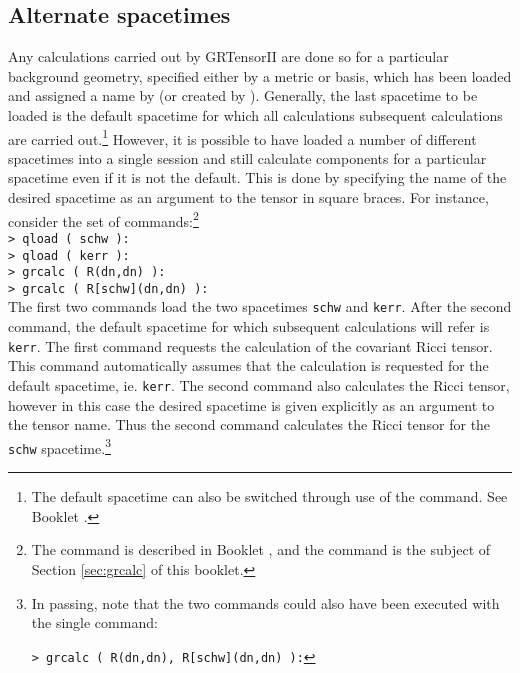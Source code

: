 \documentclass{article}
\begin{document}
\subsection{Alternate spacetimes} \label{sec:altg}
%
Any calculations carried out by GRTensorII are done so for a particular
background geometry, specified either by a metric or basis, which has
been loaded and assigned a name by  (or created by
). Generally, the last spacetime to be loaded is the
default spacetime for which all calculations subsequent calculations are
carried out.\footnote{The default spacetime can also be switched through
use of the  command. See Booklet \grMakegRef.}
However, it is possible to have
loaded a number of different spacetimes into a single session and still
calculate components for a particular spacetime even if it is not the
default. This is done by specifying the name of the desired spacetime
as an argument to the tensor in square braces. For instance, consider
the set of commands:\footnote{The  command is described in
Booklet \grMakegRef, and the  command is the subject of
Section \ref{sec:grcalc} of this booklet.}\\

\noindent\texttt{> qload ( schw ):} \\
\texttt{> qload ( kerr ):} \\
\texttt{> grcalc ( R(dn,dn) ):} \\
\texttt{> grcalc ( R[schw](dn,dn) ):} \\

\noindent The first two commands load the two spacetimes \texttt{schw}
and \texttt{kerr}. After the second command, the default spacetime for
which subsequent  calculations will refer is \texttt{kerr}. The first
 command requests the calculation of the covariant Ricci
tensor. This command automatically assumes that the calculation is
requested for the default spacetime, ie. \texttt{kerr}.
The second  command also  calculates the Ricci tensor,
however in this case the desired spacetime is given explicitly as an
argument to the tensor name. Thus the second command calculates the
Ricci tensor for the \texttt{schw} spacetime.\footnote{In passing, note
that the two  commands could also have been executed with
the single command:

\texttt{> grcalc ( R(dn,dn), R[schw](dn,dn) ):}}\\
\end{document}
